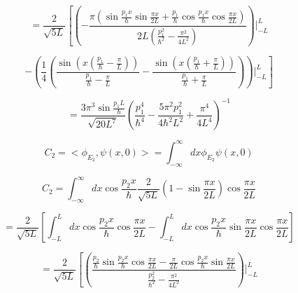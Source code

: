\documentclass[12pt,a4paper]{article}
\begin{document}
\begin{enumerate}
\begin{enumerate}
        \begin{equation*}
            =\frac{2}{\sqrt{5L}}\left[ \left(- \frac{\pi(\sin{\frac{p_1 x}{\hbar}} \sin{\frac{\pi x}{2L}} + \frac{p_1}{\hbar} \cos{\frac{p_1 x}{\hbar} \cos{\frac{\pi x}{2L}}} )}{2L(\frac{p_1^2}{\hbar^2} - \frac{\pi^2}{4L^2})}\right)|_{-L}^{L} \right.
        \end{equation*}
        
        \begin{equation*}
            \left. - \left(\frac{1}{4} (\frac{\sin{(x(\frac{p_1}{\hbar}  - \frac{\pi}{L}) )}}{\frac{p_1}{\hbar}  - \frac{\pi}{L}} - \frac{\sin{(x(\frac{p_1}{\hbar}  + \frac{\pi}{L}))}}{\frac{p_1}{\hbar}  + \frac{\pi}{L}}) \right)|_{-L}^{L}\right]
        \end{equation*}
        
        \begin{equation*}
            = \frac{3 \pi^3 \sin{\frac{p_1 L}{\hbar}}}{\sqrt{20L^7}} (\frac{p_1^4}{\hbar^4} - \frac{5 \pi^2 p_1^2}{4 \hbar^2 L^2} + \frac{\pi^4}{4L^4})^{-1}
        \end{equation*}
        
        
        
        
        \begin{equation*}
            C_2 = <\phi_{E_2}, \psi(x,0)> = \int_{-\infty}^{\infty} dx \phi_{E_2} \psi (x,0)
        \end{equation*}
        
        \begin{equation*}
            C_2 = \int_{-\infty}^{\infty} dx \cos{\frac{p_2 x}{\hbar}} \frac{2}{\sqrt{5L}}\left(1-\sin{\frac{\pi x}{2L}}\right)\cos{\frac{\pi x}{2 L}}
        \end{equation*}
        
        \begin{equation*}
            =\frac{2}{\sqrt{5L}}\left[ \int_{-L}^{L} dx \cos{\frac{p_2 x}{\hbar}} \cos{\frac{\pi x}{2 L}} - \int_{-L}^{L} dx \cos{\frac{p_2 x}{\hbar}} \sin{\frac{\pi x}{2L}} \cos{\frac{\pi x}{2L}}\right]
        \end{equation*}
        
        \begin{equation*}
             = \frac{2}{\sqrt{5L}} \left[\left(\frac{\frac{p_2}{\hbar}\sin{\frac{p_2 x}{\hbar}}\cos{\frac{\pi x}{2L}}- \frac{\pi}{2L}\cos{\frac{p_2 x}{\hbar}}\sin{\frac{\pi x}{2L}}}{\frac{p_2^2}{\hbar^2} - \frac{\pi^2}{4L^2}}\right)|_{-L}^{L} \right.
        \end{equation*}
        

\end{enumerate}
\end{enumerate}
\end{document}
